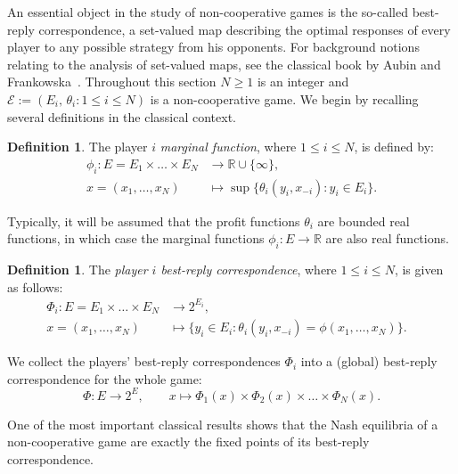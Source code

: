 \documentclass[a4paper,11pt,reqno,english]{amsart}
\theoremstyle{plain}
\theoremstyle{definition}
\newtheorem{definition}[theorem]{Definition}
\newcommand{\Ecal}{\mathcal{E}}
\begin{document}
An essential object in the study of non-cooperative games is the so-called best-reply correspondence, a set-valued map describing the optimal responses of every player to any possible strategy from his opponents.
For background notions relating to the analysis of set-valued maps, see the classical book by Aubin and Frankowska~\cite{Aubin_Frankowska_2009}.
Throughout this section $N\geq 1$ is an integer and $\Ecal:=(E_i,\,\theta_i : 1\leq i\leq N)$ is a non-cooperative game.
We begin by recalling several definitions in the classical context.

\begin{definition}\label{def:MarginalFunction}
	The player $i$ {\em marginal function}, where $1\leq i\leq N$, is defined by:
	\begin{align*}
		\phi_i\colon E = E_1\times\dots\times E_N & \longrightarrow \mathbb{R}\cup\{\infty\} ,             \\
		x = (x_1,\dots,x_N)                       & \longmapsto \sup\{\theta_i(y_i,x_{-i}) : y_i\in E_i\}.
	\end{align*}
\end{definition}

\medskip
Typically, it will be assumed that the profit functions $\theta_i$ are bounded real functions, in which case the marginal functions $\phi_i\colon E\longrightarrow \mathbb{R}$ are also real functions.

\begin{definition}\label{def:BestReplyCorrespondence}
	The {\em  player $i$ best-reply correspondence}, where $1\leq i\leq N$, is given as follows:
	\begin{align*}
		\Phi_i\colon E =  E_1\times\dots\times E_N & \longrightarrow 2^{E_i} ,                                                 & \\
		x = (x_1,\dots,x_N)                        & \longmapsto \{y_i\in E_i : \theta_i(y_i, x_{-i}) = \phi(x_1,\dots,x_N)\}. &
	\end{align*}
\end{definition}

\medskip
We collect the players' best-reply correspondences $\Phi_i$ into a (global) best-reply correspondence for the whole game:
\begin{equation}\label{eq:def:BestReplyCorrespondence}
	\Phi\colon E\longrightarrow 2^{E}, \qquad x \longmapsto \Phi_1(x)\times \Phi_2(x)\times\dots\times\Phi_N(x).
\end{equation}

\medskip
One of the most important classical results shows that the Nash equilibria of a non-cooperative game are exactly the fixed points of its best-reply correspondence.
\end{document}
